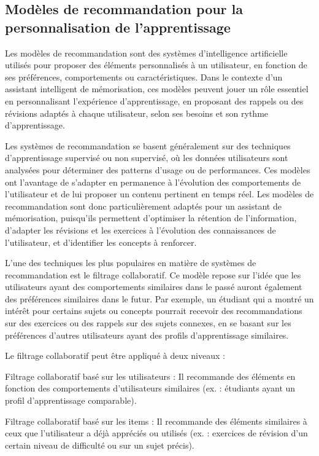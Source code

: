 \documentclass[11pt,a4paper]{report}
\begin{document}
\subsection{Modèles de recommandation pour la personnalisation de l'apprentissage}

Les modèles de recommandation sont des systèmes d’intelligence artificielle utilisés pour proposer des éléments personnalisés à un utilisateur, en fonction de ses préférences, comportements ou caractéristiques. Dans le contexte d’un assistant intelligent de mémorisation, ces modèles peuvent jouer un rôle essentiel en personnalisant l’expérience d’apprentissage, en proposant des rappels ou des révisions adaptés à chaque utilisateur, selon ses besoins et son rythme d’apprentissage.

Les systèmes de recommandation se basent généralement sur des techniques d'apprentissage supervisé ou non supervisé, où les données utilisateurs sont analysées pour déterminer des patterns d’usage ou de performances. Ces modèles ont l’avantage de s’adapter en permanence à l’évolution des comportements de l’utilisateur et de lui proposer un contenu pertinent en temps réel. Les modèles de recommandation sont donc particulièrement adaptés pour un assistant de mémorisation, puisqu’ils permettent d’optimiser la rétention de l’information, d’adapter les révisions et les exercices à l’évolution des connaissances de l’utilisateur, et d’identifier les concepts à renforcer.

L’une des techniques les plus populaires en matière de systèmes de recommandation est le filtrage collaboratif. Ce modèle repose sur l'idée que les utilisateurs ayant des comportements similaires dans le passé auront également des préférences similaires dans le futur. Par exemple, un étudiant qui a montré un intérêt pour certains sujets ou concepts pourrait recevoir des recommandations sur des exercices ou des rappels sur des sujets connexes, en se basant sur les préférences d’autres utilisateurs ayant des profils d’apprentissage similaires.

Le filtrage collaboratif peut être appliqué à deux niveaux :

Filtrage collaboratif basé sur les utilisateurs : Il recommande des éléments en fonction des comportements d’utilisateurs similaires (ex. : étudiants ayant un profil d’apprentissage comparable).

Filtrage collaboratif basé sur les items : Il recommande des éléments similaires à ceux que l’utilisateur a déjà appréciés ou utilisés (ex. : exercices de révision d’un certain niveau de difficulté ou sur un sujet précis).
\end{document}
